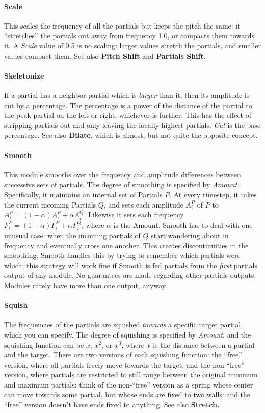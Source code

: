 \documentclass{article}
\begin{document}
\paragraph{Scale} This scales the frequency of all the partials but keeps the pitch the same: it ``stretches'' the partials out away from frequency 1.0, or compacts them towards it.  A {\it Scale} value of 0.5 is no scaling: larger values stretch the partials, and smaller values compact them.   See also  {\bf Pitch Shift} and  {\bf Partials Shift}.

\paragraph{Skeletonize} If a partial has a neighbor partial which is {\it larger} than it, then its amplitude is cut by a percentage.  The percentage is a power of the distance of the partial to the peak partial on the left or right, whichever is further.  This has the effect of stripping partials out and only leaving the locally highest partials.  {\it Cut} is the base percentage.  See also {\bf Dilate}, which is almost, but not quite the opposite concept.

\paragraph{Smooth} This module smooths over the frequency and amplitude differences between successive sets of partials.  The degree of smoothing is specified by {\it Amount}.  Specifically, it maintains an internal set of Partials \(P\).  At every timestep, it takes the current incoming Partials \(Q\), and sets each amplitude \(A^P_i\) of \(P\) to \(A^P_i = (1-\alpha) A^P_i + \alpha A^Q_i\).  Likewise it sets each frequency \(F^P_i = (1-\alpha) F^P_i + \alpha F^Q_i\), where \(\alpha\) is the Amount.  Smooth has to deal with one unusual case: when the incoming partials of \(Q\) start wandering about in frequency and eventually cross one another.  This creates discontinuities in the smoothing.  Smooth handles this by trying to remember which partials were which; this strategy will work fine if Smooth is fed partials from the {\it first} partials output of any module.  No guarantees are made regarding other partials outputs.  Modules rarely have more than one output, anyway.

\paragraph{Squish} The frequencies of the partials are squished {\it towards} a specific target partial, which you can specify.  The degree of squishing is specified by {\it Amount}, and the squishing function can be \(x\), \(x^2\), or \(x^3\), where \(x\) is the distance between a partial and the target.  There are two versions of each squishing function: the ``free'' version, where all partials freely move towards the target, and the non-``free'' version, where partials are restricted to still range between the original minimum and maximum partials: think of the non-``free'' version as a spring whose center can move towards some partial, but whose ends are fixed to two walls: and the ``free'' version doesn't have ends fixed to anything.  See also  {\bf Stretch.}
\end{document}
